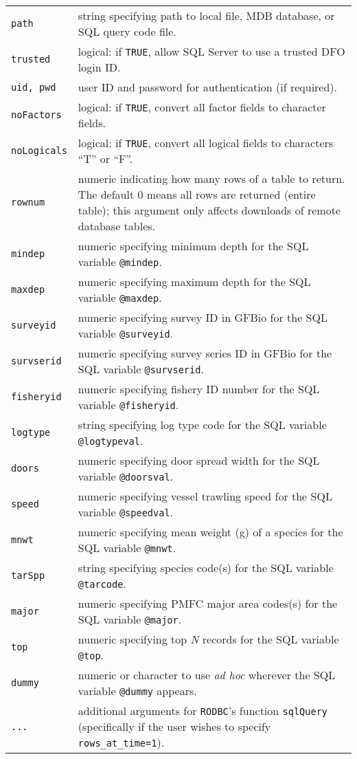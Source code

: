 \documentclass[letterpaper,12pt,fleqn]{article}
\newcommand{\code}[1]{\small\texttt{#1}\normalsize}
\newcommand{\dQuote}[1]{``#1''}
\begin{document}
\begin{longtable}[1]{l>{\raggedright\arraybackslash}p{} }
  \code{path}       &  string specifying path to local file, MDB database, or SQL query code file.\\
  \code{trusted}    &  logical: if \code{TRUE}, allow SQL Server to use a trusted DFO login ID.\\
  \code{uid, pwd}   &  user ID and password for authentication (if required).\\
  \code{noFactors}  &  logical: if \code{TRUE}, convert all factor fields to character fields.\\
  \code{noLogicals} &  logical: if \code{TRUE}, convert all logical fields to characters \dQuote{T} or \dQuote{F}.\\
  \code{rownum}     &  numeric indicating how many rows of a table to return. The default 0 means all rows are  returned (entire table); this argument only affects downloads of remote database tables.\\
  \code{mindep}     &  numeric specifying minimum depth for the SQL variable \code{@mindep}.\\
  \code{maxdep}     &  numeric specifying maximum depth for the SQL variable \code{@maxdep}.\\
  \code{surveyid}   &  numeric specifying survey ID in GFBio for the SQL variable \code{@surveyid}.\\
  \code{survserid}  &  numeric specifying survey series ID in GFBio for the SQL variable \code{@survserid}.\\
  \code{fisheryid}  &  numeric specifying fishery ID number for the SQL variable \code{@fisheryid}.\\
  \code{logtype}    &  string specifying log type code for the SQL variable \code{@logtypeval}.\\
  \code{doors}      &  numeric specifying door spread width for the SQL variable \code{@doorsval}.\\
  \code{speed}      &  numeric specifying vessel trawling speed for the SQL variable \code{@speedval}.\\
  \code{mnwt}       &  numeric specifying mean weight (g) of a species for the SQL variable \code{@mnwt}.\\
  \code{tarSpp}     &  string specifying species code(s) for the SQL variable \code{@tarcode}.\\
  \code{major}      &  numeric specifying PMFC major area codes(s) for the SQL variable \code{@major}.\\
  \code{top}        &  numeric specifying top \emph{N} records for the SQL variable \code{@top}.\\
  \code{dummy}      &  numeric or character to use \emph{ad hoc} wherever the SQL variable \code{@dummy} appears.\\
  \code{...}        &  additional arguments for \code{RODBC}'s function \code{sqlQuery} (specifically if the user wishes to specify \code{rows\_at\_time=1}).\\
\end{longtable}
\end{document}
